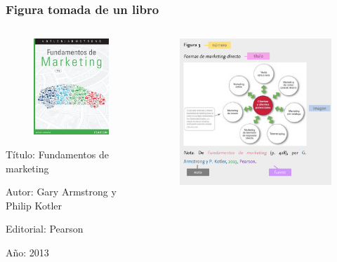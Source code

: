 \documentclass[
11pt, %
]{beamer}
\begin{document}
\begin{frame}
	\frametitle{Figura tomada de un libro}

	\begin{columns}[c] %
		\begin{column}{0.5\textwidth} %
			\begin{figure}
				\centering
				\includegraphics[width=0.5\linewidth]{images/screenshot007}
			\end{figure}
			\scriptsize{

				Título: Fundamentos de marketing

				Autor: Gary Armstrong y Philip Kotler

				Editorial: Pearson

				Año: 2013}

		\end{column}
		\begin{column}{0.5\textwidth} %
			\begin{figure}
				\centering
				\includegraphics[width=1\linewidth]{images/screenshot008}
			\end{figure}


\end{column}
\end{columns}
\end{frame}
\end{document}
